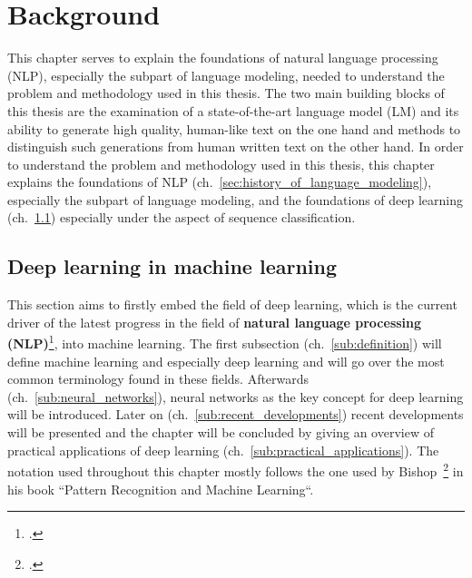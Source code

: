 \section{Background}
\label{ch:background}

This chapter serves to explain the foundations of natural language processing (NLP), especially the subpart of
language modeling, needed to understand the problem and methodology used in this thesis. The two main building blocks
of this thesis are the examination of a state-of-the-art language model (LM) and its ability to generate high quality,
human-like text on the one hand and methods to distinguish such generations from human written text on the other hand.
In order to understand the problem and methodology used in this thesis, this chapter explains the foundations
of NLP (ch.~\ref{sec:history_of_language_modeling}), especially the subpart of language
modeling, and the foundations of deep learning (ch.~\ref{sec:deep_learning_in_machine_learning}) especially under the aspect of sequence
classification.

\subsection{Deep learning in machine learning}
\label{sec:deep_learning_in_machine_learning}

This section aims to firstly embed the field of deep learning, which is the current driver of the latest progress in the field of \textbf{natural language processing (NLP)}\footcite{Deng2018}, into machine learning. The first subsection (ch.~\ref{sub:definition}) will define machine learning and especially deep learning and will go over the most common terminology found in these fields. Afterwards (ch.~\ref{sub:neural_networks}), neural networks as the key concept for deep learning will be introduced. Later on (ch.~\ref{sub:recent_developments}) recent developments will be presented and the chapter will be concluded by giving an overview of practical applications of deep learning (ch.~\ref{sub:practical_applications}). The notation used throughout this chapter mostly follows the one used by Bishop~\footcite{bishop2006pattern} in his book “Pattern Recognition and Machine Learning“.









